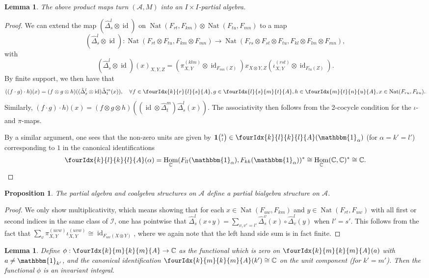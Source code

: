 \documentclass[10pt]{article}
\DeclareMathOperator{\id}{id}
\DeclareMathOperator{\Hom}{Hom}
\DeclareMathOperator{\Nat}{\mathrm{Nat}}
\newcommand{\C}{\mathbb{C}}
\newcommand{\Grt}[3]{#1{\tiny {\begin{pmatrix} #2\\#3\end{pmatrix}}}}
\newcommand{\Unitb}{\mathbbm{1}}
\newcommand{\UnitC}[2]{\Grt{\mathbf{1}}{#1}{#2}}
\newcommand{\Gr}[5]{\fourIdx{#2}{#4}{#3}{#5}{#1}}%
\newtheorem{Lem}[Theorem]{Lemma}
\newtheorem{Prop}[Theorem]{Proposition}
\theoremstyle{definition}
\numberwithin{equation}{section}
\begin{document}
\begin{Lem} The above product maps turn $(\mathscr{A},M)$ into an $I\times I$-partial algebra.
\end{Lem}
\begin{proof} We can extend the map $(\hat{\Delta}^l_s\otimes \id)$ on $\Nat(F_{rt},F_{km})\otimes \Nat(F_{tu},F_{mn})$ to a map \[(\hat{\Delta}^l_s\otimes \id): \Nat(F_{rt}\otimes F_{tu},F_{km}\otimes F_{mn}) \rightarrow  \Nat(F_{rs}\otimes F_{st}\otimes F_{tu},F_{kl}\otimes F_{lm}\otimes F_{mn}),\] with \[(\hat{\Delta}^l_s\otimes \id)(x)_{X,Y,Z} = \left(\pi^{(klm)}_{X,Y}\otimes \id_{F_{mn}(Z)}\right) x_{X\otimes Y, Z} \left(\iota^{(rst)}_{X,Y} \otimes \id_{F_{tu}(Z)}\right).\]
By finite support, we then have that \[((f\cdot g)\cdot h)(x) = (f\otimes g\otimes h)((\hat{\Delta}^l_s\otimes \id)\hat{\Delta}^m_t(x)), \quad \forall f\in \Gr{A}{k}{l}{r}{s},g\in \Gr{A}{l}{m}{s}{t},h\in \Gr{A}{m}{n}{t}{u}, x\in  \Nat(F_{ru},F_{kn}).\] Similarly, $(f\cdot g)\cdot h)(x) = (f\otimes g\otimes h)((\id\otimes \hat{\Delta}^m_t)\hat{\Delta}^l_s(x)).$ The associativity then follows from the 2-cocycle condition for the $\iota$- and $\pi$-maps. 

By a similar argument, one sees that the non-zero units are given by $\UnitC{k}{l}\in \Gr{A}{k}{k}{l}{l}(\Unitb_{\alpha})$  (for $\alpha=k'=l'$) corresponding to $1$ in the canonical identifications  \[\Gr{A}{k}{k}{l}{l}(\alpha) =\Hom_{\C}(F_{ll}(\Unitb_{\alpha}),F_{kk}(\Unitb_{\alpha}))^*\cong \Hom_{\C}(\C,\C)^*  \cong \C.\] 
\end{proof} 

\begin{Prop} The partial algebra and coalgebra structures on $\mathscr{A}$ define a partial bialgebra structure on $\mathscr{A}$. 
\end{Prop}
\begin{proof} We only show multiplicativity, which means showing that for each $x\in \Nat(F_{uw},F_{km})$ and $y\in \Nat(F_{rt},F_{uw})$ with all first or second indices in the same class of $\mathscr{I}$, one has pointwise that $\hat{\Delta}^l_s(x\circ y) = \sum_{v,v'=l'} \hat{\Delta}^v_s(x)\circ \hat{\Delta}^l_v(y)$ when  $l'=s'$. This follows from the fact that $\sum_v \pi^{(uvw)}_{X,Y}\iota^{(uvw)}_{X,Y} \cong \id_{F_{uw}(X\otimes Y)}$, where we again note that the left hand side sum is in fact finite.
\end{proof} 

\begin{Lem} Define $\phi: \Gr{A}{k}{k}{m}{m} \rightarrow \C$ as the functional which is zero on $\Gr{A}{k}{k}{m}{m}(a)$ with $a\neq \Unitb_{k'}$, and the canonical identification $\Gr{A}{k}{k}{m}{m}(k')\cong \C$ on the unit component (for $k'=m'$). Then the functional $\phi$ is an invariant integral.
\end{Lem}
\end{document}
